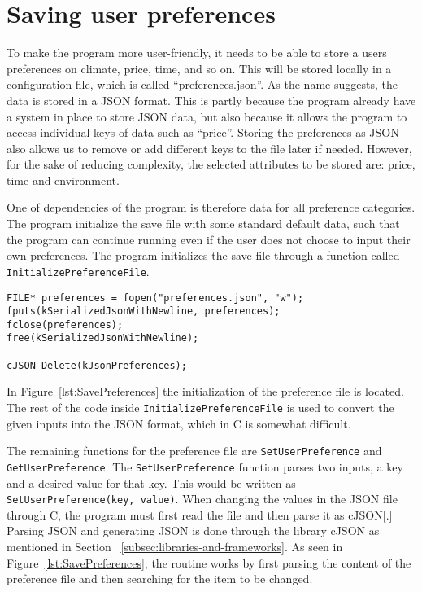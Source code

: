 \section{Saving user preferences}\label{sec:saving-user-preferences}

To make the program more user-friendly, it needs to be able to store a users preferences on climate, price,
time, and so on.
This will be stored locally in a configuration file, which is called ``\url{preferences.json}''.
As the name suggests, the data is stored in a JSON format.
This is partly because the program already have a system in place to store JSON data, but also because it allows the
program to access individual keys of data such as ``price''.
Storing the preferences as JSON also allows us to remove or add different keys to the file later if needed.
However, for the sake of reducing complexity, the selected attributes to be stored are: price, time and environment.

One of dependencies of the program is therefore data for all preference categories.
The program initialize the save file with some standard default data, such that the program can continue running even if
the user does not choose to input their own preferences.
The program initializes the save file through a function called \texttt{InitializePreferenceFile}.

\begin{lstlisting}[label={lst:SavePreferences}, caption={Saving preferences to file.}, captionpos=b]
FILE* preferences = fopen("preferences.json", "w");
fputs(kSerializedJsonWithNewline, preferences);
fclose(preferences);
free(kSerializedJsonWithNewline);

cJSON_Delete(kJsonPreferences);
\end{lstlisting}

In Figure~\ref{lst:SavePreferences} the initialization of the preference file is located.
The rest of the code inside \texttt{InitializePreferenceFile} is used to convert the given inputs into the JSON format,
which in C is somewhat difficult.

The remaining functions for the preference file are \texttt{SetUserPreference} and \texttt{GetUserPreference}.
The \texttt{SetUserPreference} function parses two inputs, a key and a desired value for that key.
This would be written as \texttt{SetUserPreference(key, value)}.
When changing the values in the JSON file through C, the program must first read the file and then parse it as cJSON[.]
Parsing JSON and generating JSON is done through the library cJSON as mentioned in Section
~\ref{subsec:libraries-and-frameworks}.
As seen in Figure~\ref{lst:SavePreferences}, the routine works by first parsing the content of the preference file and
then searching for the item to be changed.

